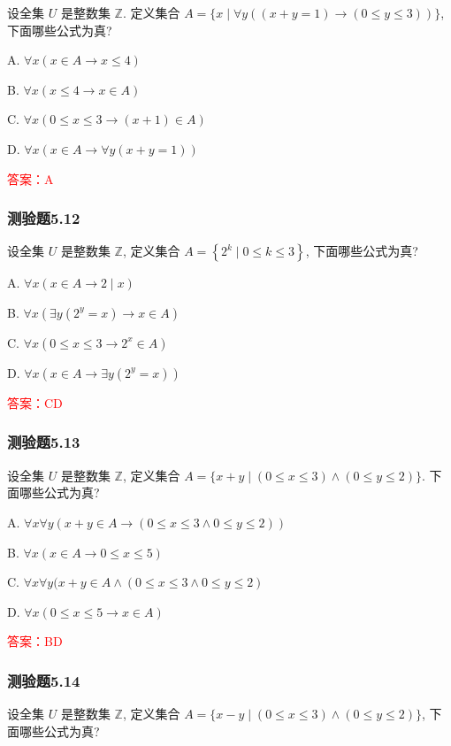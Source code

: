 \documentclass[UTF8, heading=true]{ctexart}
\begin{document}
设全集 $U$ 是整数集 $\mathbb{Z}$. 定义集合 $A=\{x \mid \forall y((x+y=1) \rightarrow(0 \leq y \leq 3))\}$, 下面哪些公式为真?

A. $\forall x(x \in A \rightarrow x \leq 4)$

B. $\forall x(x \leq 4 \rightarrow x \in A)$

C. $\forall x(0 \leq x \leq 3 \rightarrow(x+1) \in A)$

D. $\forall x(x \in A \rightarrow \forall y(x+y=1))$

\textcolor{red}{答案：A}


\subsubsection{测验题5.12}

设全集 $U$ 是整数集 $\mathbb{Z}$, 定义集合 $A=\left\{2^k \mid 0 \leq k \leq 3\right\}$, 下面哪些公式为真?

A. $\forall x(x \in A \rightarrow 2 \mid x)$

B. $\forall x\left(\exists y\left(2^y=x\right) \rightarrow x \in A\right)$

C. $\forall x\left(0 \leq x \leq 3 \rightarrow 2^x \in A\right)$

D. $\forall x\left(x \in A \rightarrow \exists y\left(2^y=x\right)\right)$

\textcolor{red}{答案：CD}

\subsubsection{测验题5.13}

设全集 $U$ 是整数集 $\mathbb{Z}$, 定义集合 $A=\{x+y \mid(0 \leq x \leq 3) \wedge(0 \leq y \leq 2)\}$. 下面哪些公式为真?

A. $\forall x \forall y(x+y \in A \rightarrow(0 \leq x \leq 3 \wedge 0 \leq y \leq 2))$

B. $\forall x(x \in A \rightarrow 0 \leq x \leq 5)$

C. $\forall x \forall y(x+y \in A \wedge(0 \leq x \leq 3 \wedge 0 \leq y \leq 2)$

D. $\forall x(0 \leq x \leq 5 \rightarrow x \in A)$

\textcolor{red}{答案：BD}


\subsubsection{测验题5.14}
设全集 $U$ 是整数集 $\mathbb{Z}$, 定义集合 $A=\{x-y \mid(0 \leq x \leq 3) \wedge(0 \leq y \leq 2)\}$, 下面哪些公式为真?
\end{document}
